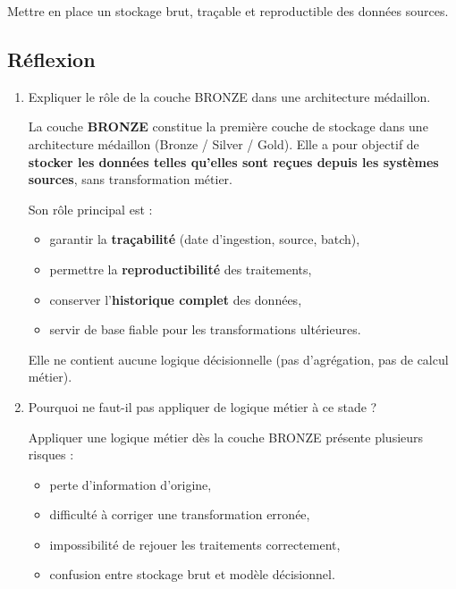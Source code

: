 \documentclass[11pt,a4paper]{article}
\begin{document}
Mettre en place un stockage brut, traçable et reproductible des données sources.

\subsection{Réflexion}

\begin{enumerate}
  \item Expliquer le rôle de la couche BRONZE dans une architecture médaillon.
    \begin{tcolorbox}[title=\textbf{Correction — Rôle de la couche BRONZE}, colback=gray!5, colframe=black]
    La couche \textbf{BRONZE} constitue la première couche de stockage dans une architecture médaillon (Bronze / Silver / Gold).
    Elle a pour objectif de \textbf{stocker les données telles qu’elles sont reçues depuis les systèmes sources}, sans transformation métier.

    Son rôle principal est :
    \begin{itemize}
      \item garantir la \textbf{traçabilité} (date d’ingestion, source, batch),
      \item permettre la \textbf{reproductibilité} des traitements,
      \item conserver l’\textbf{historique complet} des données,
      \item servir de base fiable pour les transformations ultérieures.
    \end{itemize}

    Elle ne contient aucune logique décisionnelle (pas d’agrégation, pas de calcul métier).
    \end{tcolorbox}
  \item Pourquoi ne faut-il pas appliquer de logique métier à ce stade ?
    \begin{tcolorbox}[title=\textbf{Correction — Absence de logique métier en BRONZE}, colback=gray!5, colframe=black]
    Appliquer une logique métier dès la couche BRONZE présente plusieurs risques :

    \begin{itemize}
      \item perte d’information d’origine,
      \item difficulté à corriger une transformation erronée,
      \item impossibilité de rejouer les traitements correctement,
      \item confusion entre stockage brut et modèle décisionnel.
    \end{itemize}


\end{tcolorbox}
\end{enumerate}
\end{document}
